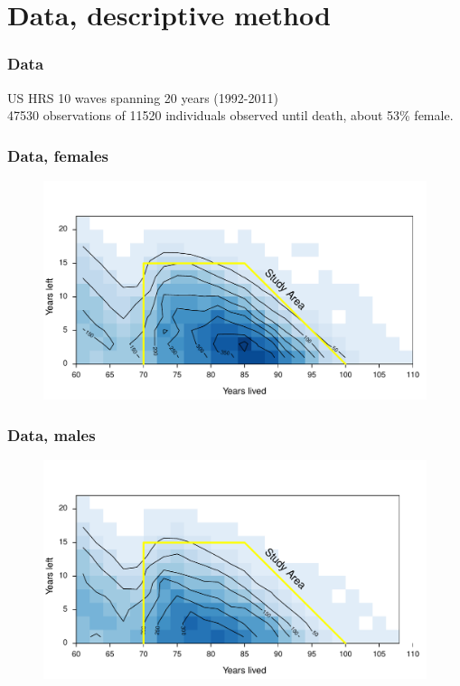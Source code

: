 \documentclass{beamer}
\begin{document}
\section{Data, descriptive method}


\begin{frame}
\frametitle{Data}
\begin{block}{US HRS}
10 waves spanning 20 years (1992-2011)\\
47530 observations of 11520 individuals observed until death, about 53\% female.
\end{block}
\end{frame}


\begin{frame}
\frametitle{Data, females}
\begin{figure}
\includegraphics[width=\linewidth]{Figures/CaseCountFemales}
\end{figure}
\end{frame}


\begin{frame}
\frametitle{Data, males}
\begin{figure}
\includegraphics[width=\linewidth]{Figures/CaseCountMales}
\end{figure}
\end{frame}
\end{document}
